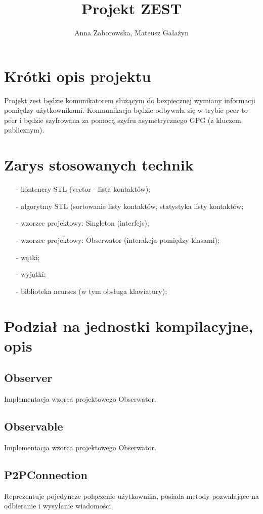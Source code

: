 \documentclass[11pt,a4paper]{article}
\author{Anna Zaborowska, Mateusz Gałażyn}
\title{Projekt ZEST}
\begin{document}
\maketitle

\section{Krótki opis projektu}

Projekt zest będzie komunikatorem służącym do bezpiecznej wymiany informacji pomiędzy użytkownikami. Komnunikacja będzie odbywała się w trybie peer to peer i będzie szyfrowana za pomocą szyfru asymetrycznego GPG (z kluczem publicznym).

\section{Zarys stosowanych technik}

\begin{itemize}
\item[-] kontenery STL (vector - lista kontaktów);
\item[-] algorytmy STL (sortowanie listy kontaktów, statystyka listy kontaktów;
\item[-] wzorzec projektowy: Singleton (interfejs);
\item[-] wzorzec projektowy: Obserwator (interakcja pomiędzy klasami);
\item[-] wątki;
\item[-] wyjątki;
\item[-] biblioteka ncurses (w tym obsługa klawiatury);
\end{itemize}

\section{Podział na jednostki kompilacyjne, opis}
\subsection{Observer}
Implementacja wzorca projektowego Obserwator.

\subsection{Observable}
Implementacja wzorca projektowego Obserwator.

\subsection{P2PConnection}
Reprezentuje pojedyncze połączenie użytkownika, posiada metody pozwalające na odbieranie i wysyłanie wiadomości.
\end{document}
